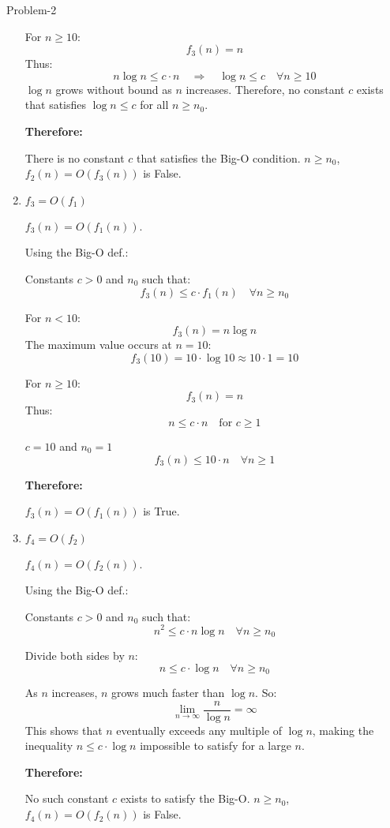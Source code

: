 \begin{problem}{}{Problem-2}
\begin{enumerate}[label=(\alph*)]
		For \(n \geq 10\):
		\[
		f_3(n) = n
		\]
		Thus:
		\[
		n \log n \leq c \cdot n \quad \Rightarrow \quad \log n \leq c \quad \forall n \geq 10
		\]
		\(\log n\) grows without bound as \(n\) increases. Therefore, no constant \(c\) exists that satisfies \(\log n \leq c\) for all \(n \geq n_0\).
		
		\textbf{Therefore:}
		
		There is no constant \(c\) that satisfies the Big-O condition. \(n \geq n_0\), \(f_2(n) = O(f_3(n))\) is False.
		
		\item \textbf{\(f_3 = O(f_1)\)}
		
		\(f_3(n) = O(f_1(n))\).
		
		Using the Big-O def.:
		
		Constants \(c > 0\) and \(n_0\) such that:
		\[
		f_3(n) \leq c \cdot f_1(n) \quad \forall n \geq n_0
		\]
		
		For \(n < 10\):
		\[
		f_3(n) = n \log n
		\]
		The maximum value occurs at \(n = 10\):
		\[
		f_3(10) = 10 \cdot \log 10 \approx 10 \cdot 1 = 10
		\]
		
		For \(n \geq 10\):
		\[
		f_3(n) = n
		\]
		Thus:
		\[
		n \leq c \cdot n \quad \text{for } c \geq 1
		\]
		
		\(c = 10\) and \(n_0 = 1\)
		\[
		f_3(n) \leq 10 \cdot n \quad \forall n \geq 1
		\]
		
		\textbf{Therefore:}
		
		\(f_3(n) = O(f_1(n))\) is True.
		
		\item \textbf{\(f_4 = O(f_2)\)}
		
		\(f_4(n) = O(f_2(n))\).
		
		Using the Big-O def.:
		
		Constants \(c > 0\) and \(n_0\) such that:
		\[
		n^2 \leq c \cdot n \log n \quad \forall n \geq n_0
		\]
		
		Divide both sides by \(n\):
		\[
		n \leq c \cdot \log n \quad \forall n \geq n_0
		\]
		
		As \(n\) increases, \(n\) grows much faster than \(\log n\). So:
		\[
		\lim_{n \to \infty} \frac{n}{\log n} = \infty
		\]
		This shows that \(n\) eventually exceeds any multiple of \(\log n\), making the inequality \(n \leq c \cdot \log n\) impossible to satisfy for a large \(n\).
		
		\textbf{Therefore:}
		
		No such constant \(c\) exists to satisfy the Big-O. \(n \geq n_0\), \(f_4(n) = O(f_2(n))\) is False.
		

\end{enumerate}
\end{problem}
